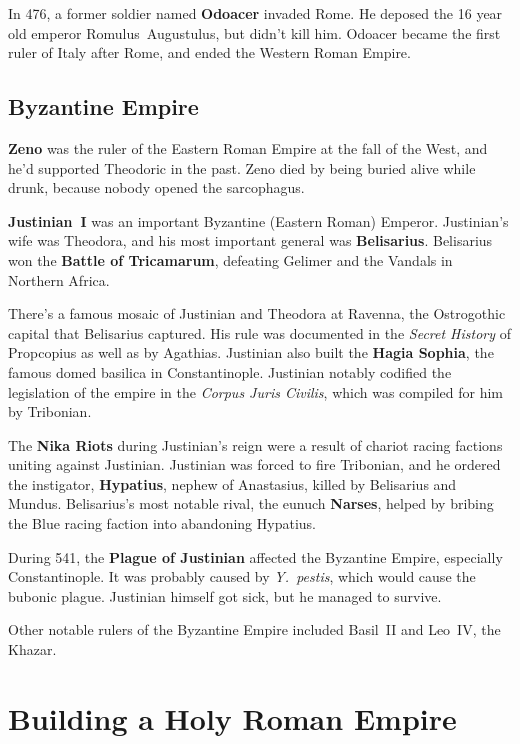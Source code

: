 In 476, a former soldier named \textbf{Odoacer} invaded Rome.
He deposed the 16 year old emperor Romulus~Augustulus, but didn't kill him.
Odoacer became the first ruler of Italy after Rome, and ended the Western Roman Empire.

\subsection*{Byzantine Empire}

\textbf{Zeno} was the ruler of the Eastern Roman Empire at the fall of the West,
and he'd supported Theodoric in the past.
Zeno died by being buried alive while drunk, because nobody opened the sarcophagus.

\textbf{Justinian~I} was an important Byzantine (Eastern Roman) Emperor.
Justinian's wife was Theodora, and his most important general was \textbf{Belisarius}.
Belisarius won the \textbf{Battle of Tricamarum},
defeating Gelimer and the Vandals in Northern Africa.

There's a famous mosaic of Justinian and Theodora at Ravenna,
the Ostrogothic capital that Belisarius captured.
His rule was documented in the \textit{Secret History} of Propcopius as well as by Agathias.
Justinian also built the \textbf{Hagia Sophia}, the famous domed basilica in Constantinople.
Justinian notably codified the legislation of the empire in the \textit{Corpus Juris Civilis},
which was compiled for him by Tribonian.

The \textbf{Nika Riots} during Justinian's reign were a result of chariot racing factions uniting against Justinian.
Justinian was forced to fire Tribonian,
and he ordered the instigator, \textbf{Hypatius}, nephew of Anastasius,
killed by Belisarius and Mundus.
Belisarius's most notable rival, the eunuch \textbf{Narses},
helped by bribing the Blue racing faction into abandoning Hypatius.

During 541, the \textbf{Plague of Justinian} affected the Byzantine Empire, especially Constantinople.
It was probably caused by \textit{Y.\ pestis}, which would cause the bubonic plague.
Justinian himself got sick, but he managed to survive.

Other notable rulers of the Byzantine Empire included Basil~II and Leo~IV, the Khazar.

\section{Building a Holy Roman Empire}

